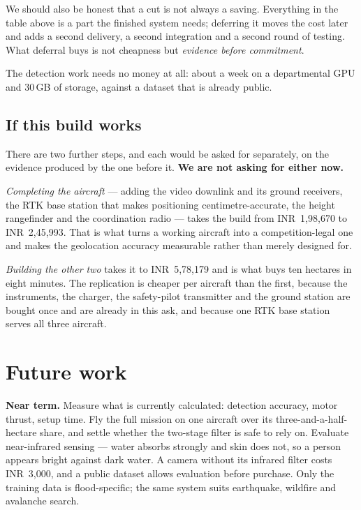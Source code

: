 \documentclass[11pt,a4paper]{article}
\newcommand{\rs}[1]{\mbox{INR~#1}}
\begin{document}
We should also be honest that a cut is not always a saving. Everything in the
table above is a part the finished system needs; deferring it moves the cost
later and adds a second delivery, a second integration and a second round of
testing. What deferral buys is not cheapness but \emph{evidence before
commitment}.

The detection work needs no money at all: about a week on a departmental GPU
and 30\,GB of storage, against a dataset that is already public.

\subsection{If this build works}

There are two further steps, and each would be asked for separately, on the
evidence produced by the one before it. \textbf{We are not asking for either
now.}

\emph{Completing the aircraft} --- adding the video downlink and its ground
receivers, the RTK base station that makes positioning centimetre-accurate, the height
rangefinder and the coordination radio --- takes the build from
\rs{1{,}98{,}670} to \rs{2{,}45{,}993}. That is what turns a working aircraft
into a competition-legal one and makes the geolocation accuracy measurable
rather than merely designed for.

\emph{Building the other two} takes it to \rs{5{,}78{,}179} and is what buys
ten hectares in eight minutes. The replication is cheaper per aircraft than the
first, because the instruments, the charger, the safety-pilot transmitter and
the ground station are bought once and are already in this ask, and because
one RTK base station serves all three aircraft.

\section{Future work}

\textbf{Near term.} Measure what is currently calculated: detection accuracy,
motor thrust, setup time. Fly the full mission on one aircraft over its
three-and-a-half-hectare share, and settle whether the two-stage filter is
safe to rely on. Evaluate near-infrared sensing --- water
absorbs strongly and skin does not, so a person appears bright against dark
water. A camera without its infrared filter costs \rs{3{,}000}, and a public
dataset allows evaluation before purchase. Only the training data is
flood-specific; the same system suits earthquake, wildfire and avalanche
search.
\end{document}
